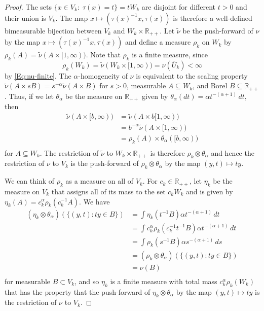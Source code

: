 \documentclass[12pt]{amsart}
\numberwithin{equation}{section}
\numberwithin{figure}{section}
\theoremstyle{plain} \newtheorem{theorem}{Theorem}[section]
\theoremstyle{plain} \newtheorem{proposition}[theorem]{Proposition}
\theoremstyle{plain} \newtheorem{lemma}[theorem]{Lemma}
\theoremstyle{plain} \newtheorem{corollary}[theorem]{Corollary}
\theoremstyle{definition} \newtheorem{definition}[theorem]{Definition}
\theoremstyle{definition} \newtheorem{notation}[theorem]{Notation}
\theoremstyle{remark} \newtheorem{remark}[theorem]{Remark}
\theoremstyle{remark} \newtheorem{example}[theorem]{Example}
\theoremstyle{definition} \newtheorem{assumption}{Assumption}
\newcommand{\bR}{\mathbb{R}}
\begin{document}
\begin{proof}
  The sets $\{x\in V_k:\; \tau(x)=t\}=t W_k$ are disjoint for
  different $t>0$ and their union is $V_k$.  The map $x\mapsto
  (\tau(x)^{-1}x,\tau(x))$ is therefore a well-defined bimeasurable
  bijection between $V_k$ and $W_k\times\bR_{++}$.  Let $\tilde \nu$
  be the push-forward of $\nu$ by the map $x \mapsto (\tau(x)^{-1} x,
  \tau(x))$ and define a measure $\rho_k$ on $W_k$ by $\rho_k(A) =
  \tilde \nu(A \times [1,\infty))$. Note that $\rho_k$ is a finite
  measure, since
  \[
  \rho_k(W_k) 
  = \tilde \nu(W_k \times [1,\infty))=\nu(\bar U_k)<\infty
  \]
  by \eqref{Eq:nu-finite}.  The $\alpha$-homogeneity of $\nu$ is
  equivalent to the scaling property $\tilde \nu(A \times s B) =
  s^{-\alpha} \tilde \nu(A \times B)$ for $s>0$, measurable $A
  \subseteq W_k$, and Borel $B \subseteq \bR_{++}$.  Thus, if we let
  $\theta_\alpha$ be the measure on $\bR_{++}$ given by
  $\theta_\alpha(dt) = \alpha t^{-(\alpha+1)} \, dt$, then
  \[
  \begin{split}
    \tilde \nu(A \times [b,\infty)) 
    & = \tilde \nu(A \times b [1,\infty)) \\
    & = b^{-\alpha} \tilde \nu(A \times [1,\infty)) \\
    & = \rho_k(A) \times \theta_\alpha([b,\infty)) \\
  \end{split}
  \]
  for $A \subseteq W_k$.  The restriction of $\tilde \nu$
  to $W_k \times \bR_{++}$ is therefore $\rho_k \otimes \theta_\alpha$ and
  hence the restriction of $\nu$ to $V_k$ is the push-forward of
  $\rho_k \otimes \theta_\alpha$ by the map $(y,t) \mapsto ty$.

  We can think of $\rho_k$ as a measure on all of $V_k$.  For $c_k
  \in \bR_{++}$, let $\eta_k$ be the measure on $V_k$ that assigns
  all of its mass to the set $c_k W_k$ and is given by $\eta_k(A) =
  c_k^\alpha \rho_k(c_k^{-1} A)$.  We have
  \[
  \begin{split}
    (\eta_k \otimes \theta_\alpha)(\{(y,t) : ty \in B\})
    & = \int \eta_k(t^{-1} B)  \alpha t^{-(\alpha+1)} \, dt \\
    & = \int c_k^\alpha \rho_k(c_k^{-1} t^{-1} B) \alpha t^{-(\alpha+1)} \, dt \\
    & = \int \rho_k(s^{-1} B) \alpha s^{-(\alpha+1)} \, ds \\
    & =  (\rho_k \otimes \theta_\alpha)(\{(y,t) : ty \in B\}) \\
    & = \nu(B) \\
  \end{split}
  \]
  for measurable $B\subset V_k$, 
  and so $\eta_k$ is a finite measure with total mass 
  $c_k^\alpha \rho_k(W_k)$ that has the property that
  the push-forward of $\eta_k \otimes \theta_\alpha$ by
  the map $(y,t) \mapsto ty$ is the restriction of
  $\nu$ to $V_k$.
  

\end{proof}
\end{document}
